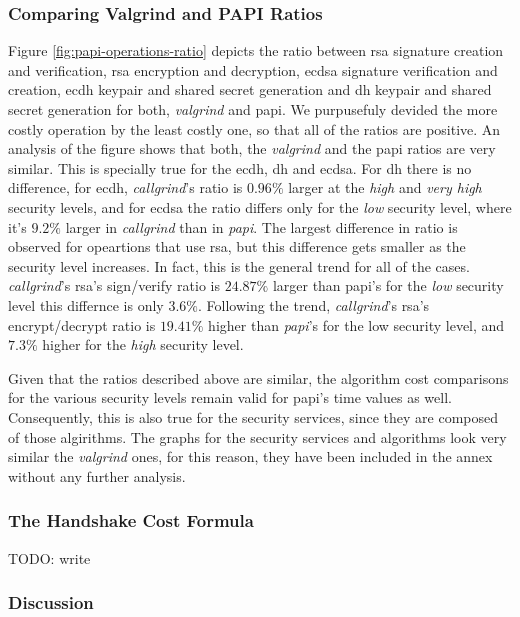 \documentclass{llncs}
\begin{document}
\subsubsection{Comparing Valgrind and PAPI Ratios}

Figure \ref{fig:papi-operations-ratio} depicts the ratio between \gls{rsa} signature creation and verification, \gls{rsa}
encryption and decryption, \gls{ecdsa} signature verification and creation, \gls{ecdh} keypair and shared secret generation and
\gls{dh} keypair and shared secret generation for both, \textit{valgrind} and \gls{papi}. We purpusefuly devided the more
costly operation by the least costly one, so that all of the ratios are positive. An analysis of the figure shows that
both, the \textit{valgrind} and the \gls{papi} ratios are very similar. This is specially true for the \gls{ecdh}, \gls{dh}
and \gls{ecdsa}. For \gls{dh} there is no difference, for \gls{ecdh}, \textit{callgrind}'s ratio is $0.96\%$ larger at the \textit{high} and
\textit{very high} security levels, and for \gls{ecdsa} the ratio differs only for the \textit{low} 
security level, where it's $9.2\%$ larger in \textit{callgrind} than in \textit{papi}. The largest difference in ratio
is observed for opeartions that use \gls{rsa}, but this difference gets smaller as the security level increases. In fact,
this is the general trend for all of the cases. \textit{callgrind}'s \gls{rsa}'s sign/verify ratio is $24.87\%$ larger than \gls{papi}'s
for the \textit{low} security level this differnce is only $3.6\%$. Following the trend, \textit{callgrind}'s \gls{rsa}'s encrypt/decrypt ratio is $19.41\%$ higher
than \textit{papi}'s for the low security level, and $7.3\%$ higher for the \textit{high} security level.

Given that the ratios described above are similar, the algorithm cost comparisons for the various security levels remain valid for \gls{papi}'s time values as well.
Consequently, this is also true for the security services, since they are composed of those algirithms. The graphs for the security services and algorithms look very similar
the \textit{valgrind} ones, for this reason, they have been included in the annex without any further analysis.

\subsubsection{The Handshake Cost Formula}

TODO: write

\subsubsection{Discussion}
\end{document}
